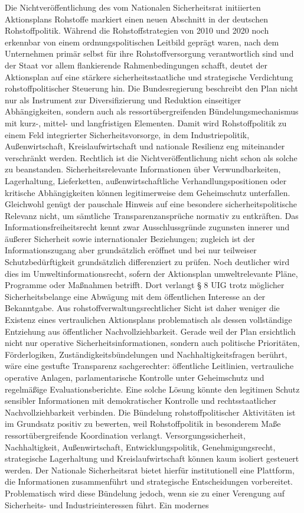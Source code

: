 \documentclass[12pt,a4paper,oneside]{book} %
\begin{document}
Die Nichtveröffentlichung des vom Nationalen Sicherheitsrat initiierten Aktionsplans Rohstoffe markiert einen neuen Abschnitt in der deutschen Rohstoffpolitik. Während die Rohstoffstrategien von 2010 und 2020 noch erkennbar von einem ordnungspolitischen Leitbild geprägt waren, nach dem Unternehmen primär selbst für ihre Rohstoffversorgung verantwortlich sind und der Staat vor allem flankierende Rahmenbedingungen schafft, deutet der Aktionsplan auf eine stärkere sicherheitsstaatliche und strategische Verdichtung rohstoffpolitischer Steuerung hin. Die Bundesregierung beschreibt den Plan nicht nur als Instrument zur Diversifizierung und Reduktion einseitiger Abhängigkeiten, sondern auch als ressortübergreifenden Bündelungsmechanismus mit kurz-, mittel- und langfristigen Elementen. Damit wird Rohstoffpolitik zu einem Feld integrierter Sicherheitsvorsorge, in dem Industriepolitik, Außenwirtschaft, Kreislaufwirtschaft und nationale Resilienz eng miteinander verschränkt werden. Rechtlich ist die Nichtveröffentlichung nicht schon als solche zu beanstanden. Sicherheitsrelevante Informationen über Verwundbarkeiten, Lagerhaltung, Lieferketten, außenwirtschaftliche Verhandlungspositionen oder kritische Abhängigkeiten können legitimerweise dem Geheimschutz unterfallen. Gleichwohl genügt der pauschale Hinweis auf eine besondere sicherheitspolitische Relevanz nicht, um sämtliche Transparenzansprüche normativ zu entkräften. Das Informationsfreiheitsrecht kennt zwar Ausschlussgründe zugunsten innerer und äußerer Sicherheit sowie internationaler Beziehungen; zugleich ist der Informationszugang aber grundsätzlich eröffnet und bei nur teilweiser Schutzbedürftigkeit grundsätzlich differenziert zu prüfen. Noch deutlicher wird dies im Umweltinformationsrecht, sofern der Aktionsplan umweltrelevante Pläne, Programme oder Maßnahmen betrifft. Dort verlangt § 8 UIG trotz möglicher Sicherheitsbelange eine Abwägung mit dem öffentlichen Interesse an der Bekanntgabe. Aus rohstoffverwaltungsrechtlicher Sicht ist daher weniger die Existenz eines vertraulichen Aktionsplans problematisch als dessen vollständige Entziehung aus öffentlicher Nachvollziehbarkeit. Gerade weil der Plan ersichtlich nicht nur operative Sicherheitsinformationen, sondern auch politische Prioritäten, Förderlogiken, Zuständigkeitsbündelungen und Nachhaltigkeitsfragen berührt, wäre eine gestufte Transparenz sachgerechter: öffentliche Leitlinien, vertrauliche operative Anlagen, parlamentarische Kontrolle unter Geheimschutz und regelmäßige Evaluationsberichte. Eine solche Lösung könnte den legitimen Schutz sensibler Informationen mit demokratischer Kontrolle und rechtsstaatlicher Nachvollziehbarkeit verbinden. Die Bündelung rohstoffpolitischer Aktivitäten ist im Grundsatz positiv zu bewerten, weil Rohstoffpolitik in besonderem Maße ressortübergreifende Koordination verlangt. Versorgungssicherheit, Nachhaltigkeit, Außenwirtschaft, Entwicklungspolitik, Genehmigungsrecht, strategische Lagerhaltung und Kreislaufwirtschaft können kaum isoliert gesteuert werden. Der Nationale Sicherheitsrat bietet hierfür institutionell eine Plattform, die Informationen zusammenführt und strategische Entscheidungen vorbereitet. Problematisch wird diese Bündelung jedoch, wenn sie zu einer Verengung auf Sicherheits- und Industrieinteressen führt. Ein modernes 
\end{document}
